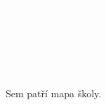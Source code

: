 \documentclass{article}
\begin{document}
\begin{titlepage}
  \pagecolor{red}
    \begin{center}
      \vspace*{\fill}

      \textcolor{white}{\fontsize{60}{60} \Kapitan Průvodce\\\vspace{0.2em}prváka}

      \vspace*{\fill}
      \textcolor{white}{\fontsize{20}{20} \Kapitan Jaroška}

      \vspace{0.5em}

      \begin{bluebox}
        \centering \fontsize{15}{15} \Kapitan \textcolor{white}{2024/2025}
      \end{bluebox}

      \vspace{3em}

    \end{center}
\end{titlepage}
\pagecolor{white}


Sem patří mapa školy.
\centering
\end{document}
